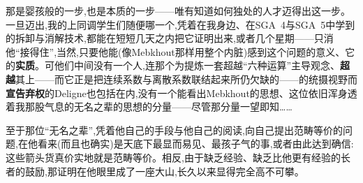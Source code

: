 \noindent 那是婴孩般的一步,也是本质的一步——唯有知道如何独处的人才迈得出这一步。一旦迈出,我的上同调学生们随便哪一个,凭着在我身边、在SGA~4与SGA~5中学到的拆卸与消解技术,都能在短短几天\dmark{}之内把它证明出来,或者几个星期——只消他“接得住”,当然,只要他能(像Mebkhout那样用整个内脏)感到这个问题的意义、它的\textbf{实质}。可他们中间没有一个人,连那个为提炼一套超越“六种运算”主导观念、\textbf{超越}其上——而它正是把连续系数与离散系数联结起来所仍欠缺的——的统摄视野而\textbf{宣告弃权}的Deligne也包括在内,没有一个能看出Mebkhout的思想、这位依旧浑身透着我那股气息的无名之辈的思想的分量——尽管那分量一望即知……

\noindent 至于那位“无名之辈”,凭着他自己的手段与他自己的阅读,向自己提出范畴等价的问题,在他看来(而且也确实)是天底下最显而易见、最孩子气的事,或者由此达到确信:这些箭头货真价实地就是范畴等价。相反,由于缺乏经验、缺乏比他更有经验的长者的鼓励,那证明在他眼里成了一座大山,长久以来显得完全高不可攀。

